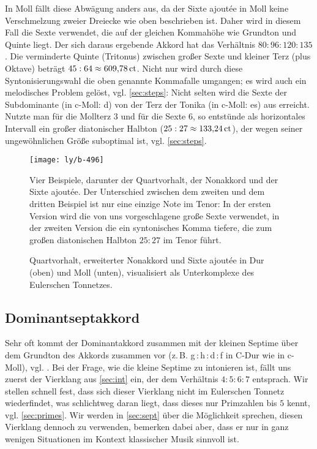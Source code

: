 In Moll fällt diese Abwägung anders aus, da der Sixte ajoutée in Moll keine
Verschmelzung zweier Dreiecke wie oben beschrieben ist.  Daher wird in diesem
Fall die Sexte verwendet, die auf der gleichen Kommahöhe wie Grundton und Quinte
liegt. Der sich daraus ergebende Akkord hat das Verhältnis $80:96:120:135$.  Die
verminderte Quinte (Tritonus) zwischen großer Sexte und kleiner Terz (plus
Oktave) beträgt $45:64\approx 609{,}78\,\text{ct}$.  Nicht nur wird durch diese
Syntonisierungswahl die oben genannte Kommafalle umgangen; es wird auch ein
melodisches Problem gelöst, vgl. \cref{sec:steps}: Nicht selten wird die Sexte
der Subdominante (in c-Moll: d) von der Terz der Tonika (in c-Moll: es) aus
erreicht.  Nutzte man für die Mollterz \flatp $3$ und für die Sexte \naturalp
$6$, so entstünde als horizontales Intervall ein großer diatonischer Halbton
($25:27\approx 133{,}24\,\text{ct}$), der wegen seiner ungewöhnlichen Größe suboptimal
ist, vgl. \cref{sec:steps}.


\begin{figure}
  \centering
  \texttt{[image: ly/b-496]}
  \caption{Vier Beispiele, darunter der Quartvorhalt, der Nonakkord und der
    Sixte ajoutée. Der Unterschied zwischen dem zweiten und dem dritten Beispiel
    ist nur eine einzige Note im Tenor: In der ersten Version wird die von uns
    vorgeschlagene große Sexte verwendet, in der zweiten Version die ein
    syntonisches Komma tiefere, die zum großen diatonischen Halbton $25:27$ im
    Tenor führt.}\label{fig:496}
\end{figure}

\begin{figure}
  \centering
  
  \caption{Quartvorhalt, erweiterter Nonakkord und Sixte ajoutée in Dur (oben)
    und Moll (unten), visualisiert als Unterkomplexe des Eulerschen
    Tonnetzes.}\label{fig:chordLines}
\end{figure}

\subsection{Dominantseptakkord}
\label{sec:dom7syn}

Sehr oft kommt der Dominantakkord zusammen mit der kleinen Septime über dem
Grundton des Akkords zusammen vor (z.\,B. g\,:\,h\,:\,d\,:\,f in C-Dur wie in
c-Moll), vgl. \cite[{}9.1]{Skript}.  Bei der Frage, wie die kleine Septime zu
intonieren ist, fällt uns zuerst der Vierklang aus \cref{sec:int} ein, der dem
Verhältnis $4:5:6:7$ entsprach. Wir stellen schnell fest, dass sich dieser
Vierklang nicht im Eulerschen Tonnetz wiederfindet, was schlichtweg daran liegt,
dass dieses nur Primzahlen bis $5$ kennt, vgl. \cref{sec:primes}.  Wir werden in
\cref{sec:sept} über die Möglichkeit sprechen, diesen Vierklang dennoch zu
verwenden, bemerken dabei aber, dass er nur in ganz wenigen Situationen im
Kontext klassischer Musik sinnvoll ist.

